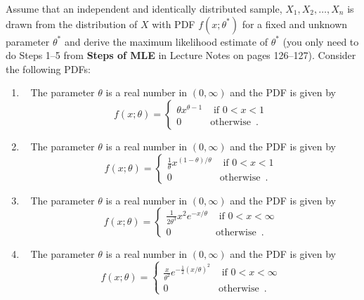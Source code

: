 \begin{Exercise}[title={MLE Exercises},label={ExsMLEExercises}]
Assume that an independent and identically distributed sample, $X_1 , X_2 , \ldots, X_n$ 
is drawn from the distribution of $X$ with PDF $f(x; \theta^*)$ for a fixed and unknown 
parameter $\theta^*$ and derive the maximum likelihood estimate of $\theta^*$ (you only need to do {\sf Steps 1--5} from {\bf Steps of MLE} in Lecture Notes on pages 126--127).  
Consider the following PDFs:
\begin{enumerate}
\item~
The parameter $\theta$ is a real number in $(0,\infty)$ and the PDF is given by
\[
f(x;\theta) = 
\begin{cases}
\theta x^{\theta-1} & \text{ if } 0 < x < 1\\
0 & \text{otherwise} \enspace .
\end{cases}
\]

\item~
The parameter $\theta$ is a real number in $(0,\infty)$ and the PDF is given by
\[
f(x;\theta) = 
\begin{cases}
\frac{1}{\theta} x^{(1-\theta)/\theta} & \text{ if } 0 < x < 1\\
0 & \text{otherwise} \enspace .
\end{cases}
\]

\item~
The parameter $\theta$ is a real number in $(0,\infty)$ and the PDF is given by
\[
f(x;\theta) = 
\begin{cases}
\frac{1}{2\theta^3} x^{2}e^{-x/\theta} & \text{ if } 0 < x < \infty\\
0 & \text{otherwise} \enspace .
\end{cases}
\]

\item~
The parameter $\theta$ is a real number in $(0,\infty)$ and the PDF is given by
\[
f(x;\theta) = 
\begin{cases}
\frac{x}{\theta^2} e^{-\frac{1}{2}(x/\theta)^2} & \text{ if } 0 < x  < \infty \\
0 & \text{otherwise} \enspace .
\end{cases}
\]



\end{enumerate}
\end{Exercise}

